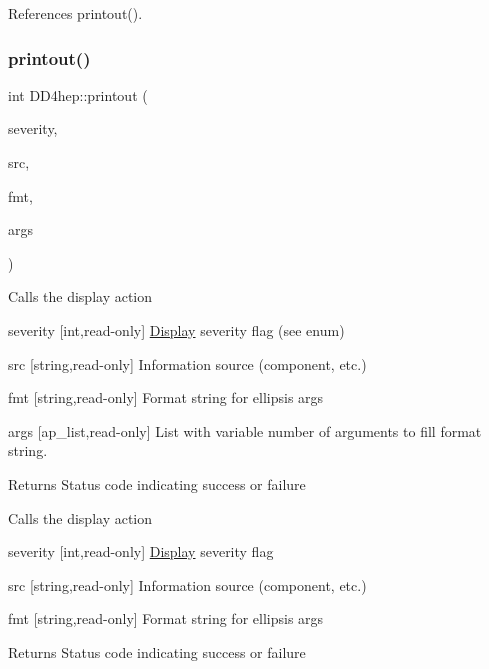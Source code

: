 References printout().

\hypertarget{namespace_d_d4hep_a7cb4c929065e6f4c054748cfcdc90f9c}{}\label{namespace_d_d4hep_a7cb4c929065e6f4c054748cfcdc90f9c} 
\subsubsection{\texorpdfstring{printout()}{printout()}\hspace{0.1cm}{\footnotesize\ttfamily [7/8]}}
{\footnotesize\ttfamily int D\+D4hep\+::printout (\begin{DoxyParamCaption}\item[{\hyperlink{namespace_d_d4hep_a5b5a64d56252469451f2020a27d57d42}{Print\+Level}}]{severity,  }\item[{const std\+::string \&}]{src,  }\item[{const std\+::string \&}]{fmt,  }\item[{va\+\_\+list \&}]{args }\end{DoxyParamCaption})}

Calls the display action \begin{DoxyItemize}
\item severity \mbox{[}int,read-\/only\mbox{]} \hyperlink{class_d_d4hep_1_1_display}{Display} severity flag (see enum) \item src \mbox{[}string,read-\/only\mbox{]} Information source (component, etc.) \item fmt \mbox{[}string,read-\/only\mbox{]} Format string for ellipsis args \item args \mbox{[}ap\+\_\+list,read-\/only\mbox{]} List with variable number of arguments to fill format string. \begin{DoxyReturn}{Returns}
Status code indicating success or failure
\end{DoxyReturn}
Calls the display action \item severity \mbox{[}int,read-\/only\mbox{]} \hyperlink{class_d_d4hep_1_1_display}{Display} severity flag \item src \mbox{[}string,read-\/only\mbox{]} Information source (component, etc.) \item fmt \mbox{[}string,read-\/only\mbox{]} Format string for ellipsis args \begin{DoxyReturn}{Returns}
Status code indicating success or failure 
\end{DoxyReturn}
\end{DoxyItemize}



